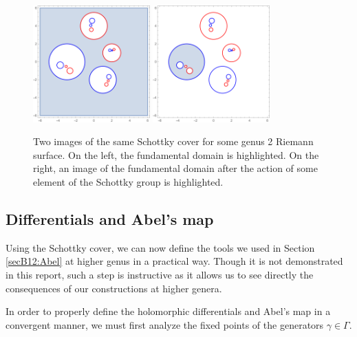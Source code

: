 \begin{figure}
    \center
    \includegraphics[width=0.4\textwidth]{assets/Genus2SchottkyOuter.png}
    \includegraphics[width=0.4\textwidth]{assets/Genus2SchottkyInner.png}
    \caption{
        Two images of the same Schottky cover for some genus 2 Riemann surface.
        On the left, the fundamental domain is highlighted.
        On the right, an image of the fundamental domain after the action of some element of the Schottky group is highlighted.
    }
    \label{figB12:SchottkyIntuition2}
\end{figure}

\subsection{Differentials and Abel's map}\label{secB12:SchottkyDifAndAbel}

Using the Schottky cover, we can now define the tools we used in Section \ref{secB12:Abel} at higher genus in a practical way.
Though it is not demonstrated in this report, such a step is instructive as it allows us to see directly the consequences of our constructions at higher genera.

In order to properly define the holomorphic differentials and Abel's map in a convergent manner, we must first analyze the fixed points of the generators $\gamma \in \Gamma$.

